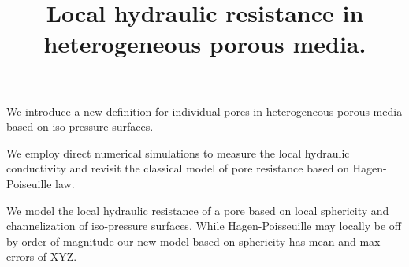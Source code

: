 \documentclass[draft]{agujournal2019}
\begin{document}
\title{Local hydraulic resistance in heterogeneous porous media.}











\begin{keypoints}
\item We introduce a new definition for individual pores in heterogeneous porous media based on iso-pressure surfaces.
\item We employ direct numerical simulations to measure the local hydraulic conductivity and revisit the classical model of pore resistance based on Hagen-Poiseuille law. 
\item We model the local hydraulic resistance of a pore based on local sphericity and channelization of iso-pressure surfaces. While Hagen-Poisseuille may locally be off by order of magnitude our new model based on sphericity has mean and max errors of XYZ.
\end{keypoints}
\end{document}
